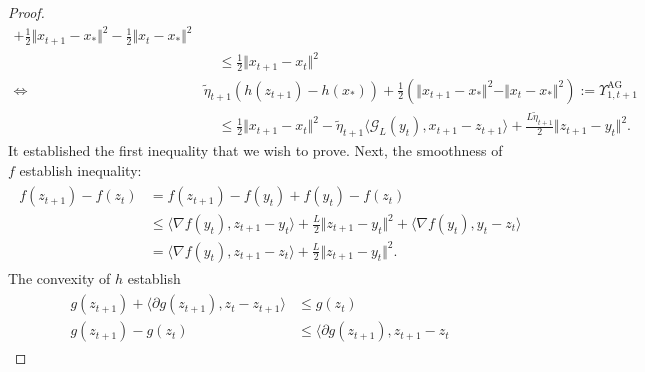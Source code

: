 \documentclass[12pt]{article}
\begin{document}
\begin{proof}
{\begin{align*}
                +
                \frac{1}{2}\Vert x_{t+1} - x_*\Vert^2 - 
                \frac{1}{2}\Vert x_t - x_*\Vert^2
                \\
                & \quad \le
                \frac{1}{2}\Vert x_{t + 1} - x_t\Vert^2 
                \\
                \iff &
                \tilde\eta_{t + 1}(h(z_{t + 1}) - h(x_*))
                + \frac{1}{2}\left(
                    \Vert x_{t + 1} - x_*\Vert^2 
                    - 
                    \Vert x_t - x_*\Vert^2
                \right) := \Upsilon_{1, t + 1}^\text{AG}
                \\
                &\quad \le 
                \frac{1}{2}\Vert x_{t + 1} - x_t\Vert^2 
                - 
                \tilde\eta_{t + 1}
                \langle \mathcal G_L(y_t), x_{t +1} - z_{t + 1}\rangle
                + 
                \frac{L \tilde\eta_{t + 1}}{2}\Vert z_{t + 1} - y_t\Vert^2. 
            \end{align*}
            }
            It established the first inequality that we wish to prove. 
            Next, the smoothness of $f$ establish inequality: 
            \begin{align*}
                \begin{aligned}
                    f(z_{t + 1}) - f(z_t) &= f(z_{t + 1}) - f(y_t) + f(y_t) - f(z_t) 
                    \\
                    &\le 
                    \langle \nabla f(y_t), z_{t + 1} - y_t\rangle + \frac{L}{2}\Vert z_{t + 1} - y_t\Vert^2 
                    + 
                    \langle \nabla f(y_t), y_t - z_t\rangle
                    \\
                    &= 
                    \langle \nabla f(y_t), z_{t + 1} - z_t\rangle + \frac{L}{2}\Vert z_{t + 1} - y_t\Vert^2. 
                \end{aligned}
                \tag{$[**]$}
            \end{align*}
            The convexity of $h$ establish 
            \begin{align*}
                \begin{aligned}
                    g(z_{t + 1}) + 
                    \langle \partial g(z_{t + 1}), z_t - z_{t + 1}\rangle
                    &\le g(z_t)
                    \\
                    g(z_{t + 1}) - g(z_t)
                    &\le 
                    \langle 
                        \partial g (z_{t +1}), 
                        z_{t + 1} - z_t

\end{aligned}
\end{align*}
\end{proof}
\end{document}
